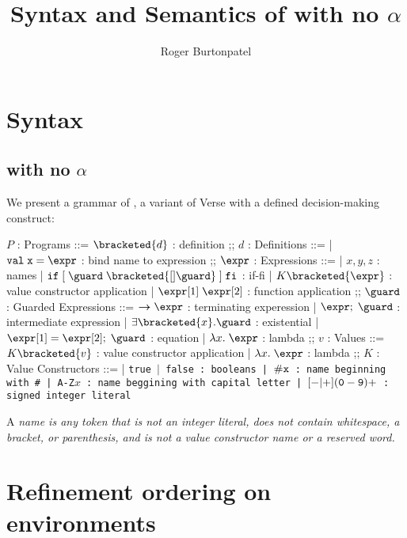 \documentclass[]{article}
\title{Syntax and Semantics of \VMinus with no $\alpha$}
\author{Roger Burtonpatel}
\begin{document}
\maketitle

\section{Syntax}

\subsection{\VMinus with no $\alpha$}

We present a grammar of \VMinus, a variant of Verse with a defined
decision-making construct: 

\bigskip


\begin{center}
    \begin{bnf}
    $P$ : \textsf{Programs} ::=
    $\bracketed{d}$ : definition
    ;;
    $d$ : \textsf{Definitions} ::=
    | $\tt{val} \; x \; \tt{=} \; \expr$ : bind name to expression
    ;;
    $\expr$ : \textsf{Expressions} ::=
    | $x, y, z$ : names
    | $\tt{if} \; \tt{[}\; \guard \; \bracketed{[] \guard} \;\tt{]} \; \tt{fi}$ : if-fi 
    | $K \bracketed{\expr}$ : value constructor application 
    | $\expr[1] \; \expr[2]$ : function application 
    ;;
    $\guard$ : \textsf{Guarded Expressions} ::=  
    $\boldsymbol{\rightarrow}\expr$ : terminating experession
    | $\expr; \; \guard$ : intermediate expression 
    | $\exists \bracketed{x} \tt{.} \guard$ : existential 
    | $\expr[1] = \expr[2]; \; \guard$ : equation 
    | $\lambda x. \; \expr$ : lambda 
    ;;
    $v$ : Values ::= $K\bracketed{v}$ : value constructor application 
    | $\lambda x. \; \expr$ : lambda 
    ;;
    $K$ : \textsf{Value Constructors} ::=
    | \tt{true} $\vert$ \tt{false} : booleans
    | $\tt{\#}x$ : name beginning with \tt{\#}
    | \tt{A-Z}$x$ : name beggining with capital letter
    | $[\tt{-}\vert\tt{+}](\tt{0}-\tt{9})+$ : signed integer literal 
    \end{bnf}
\end{center}

A \it{name} is any token that is not an integer literal, 
does not contain whitespace, a bracket, or parenthesis, 
and is not a value constructor name or a reserved word.
        
\section{Refinement ordering on environments}
\end{document}
